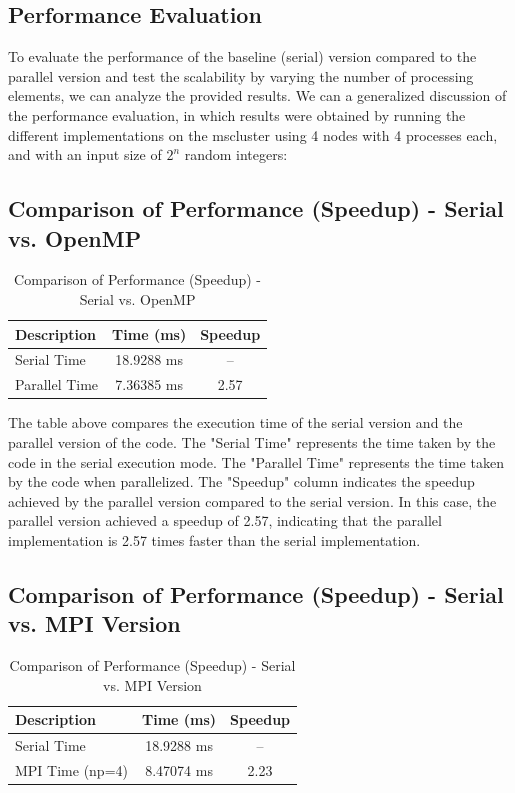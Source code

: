 \subsection{Performance Evaluation}
To evaluate the performance of the baseline (serial) version compared to the parallel version and test the scalability by varying the number of processing elements, we can analyze the provided results. We can a generalized discussion of the performance evaluation, in which results were obtained by running the different implementations on the mscluster using 4 nodes with 4 processes each, and with an input size of $2^{n}$ random integers:

\subsection*{Comparison of Performance (Speedup) - Serial vs. OpenMP}

\begin{table}[htbp]
  \caption{Comparison of Performance (Speedup) - Serial vs. OpenMP}
  \centering
  \begin{tabular}{lcc}
    \toprule
    \textbf{Description} & \textbf{Time (ms)} & \textbf{Speedup} \\
    \midrule
    Serial Time & 18.9288 ms & -- \\
    Parallel Time & 7.36385 ms & 2.57 \\
    \bottomrule
  \end{tabular}
\end{table}

The table above compares the execution time of the serial version and the parallel version of the code. The "Serial Time" represents the time taken by the code in the serial execution mode. The "Parallel Time" represents the time taken by the code when parallelized. The "Speedup" column indicates the speedup achieved by the parallel version compared to the serial version. In this case, the parallel version achieved a speedup of 2.57, indicating that the parallel implementation is 2.57 times faster than the serial implementation.

\subsection*{Comparison of Performance (Speedup) - Serial vs. MPI Version}

\begin{table}[htbp]
  \caption{Comparison of Performance (Speedup) - Serial vs. MPI Version}
  \centering
  \begin{tabular}{lcc}
    \toprule
    \textbf{Description} & \textbf{Time (ms)} & \textbf{Speedup} \\
    \midrule
    Serial Time & 18.9288 ms & -- \\
    MPI Time (np=4) & 8.47074 ms & 2.23 \\
    \bottomrule
  \end{tabular}
\end{table}

